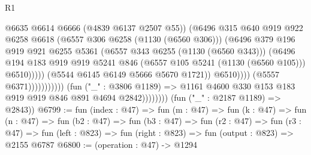 \begin{lexlean}{R1}
\begin{coremodule}
                                                        @6635
                                                        @6614
                                                        @6666
                                                        (@4839 @6137 @2507 @55))
                                                      (@6496
                                                        @315
                                                        @640
                                                        @919
                                                        @922
                                                        @6258
                                                        @6618
                                                        (@6557 @306 @6258 (@1130 (@6560 @306)))
                                                        (@6496
                                                          @379
                                                          @196
                                                          @919
                                                          @921
                                                          @6255
                                                          @5361
                                                          (@6557 @343 @6255 (@1130 (@6560 @343)))
                                                          (@6496
                                                            @194
                                                            @183
                                                            @919
                                                            @919
                                                            @5241
                                                            @846
                                                            (@6557 @105 @5241 (@1130 (@6560 @105)))
                                                            @6510)))))
                                                  (@5544 @6145 @6149 @5666 @5670 @1721))
                                                @6510))))
                                        (@5557 @6371)))))))))))
                    (fun ("_" : @3806 @1189) =>
                    @1161 @4600 @330 @153 @183 @919 @919 @846 @891 @4694 @2842))))))))
      (fun ("_" : @2187 @1189) => @2843))
@6799 := fun (index : @47) =>
  fun (m : @47) =>
  fun (k : @47) =>
  fun (n : @47) =>
  fun (b2 : @47) =>
  fun (b3 : @47) =>
  fun (r2 : @47) =>
  fun (r3 : @47) => fun (left : @823) => fun (right : @823) => fun (output : @823) => @2155 @6787
@6800 := (operation : @47) -> @1294

\end{coremodule}
\end{lexlean}
